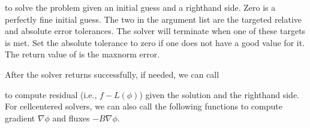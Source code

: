 \documentclass[letterpaper,10pt,english]{sphinxmanual}
\begin{document}
\sphinxAtStartPar
to solve the problem given an initial guess and a right\sphinxhyphen{}hand side.
Zero is a perfectly fine initial guess.  The two  in the argument
list are the targeted relative and absolute error tolerances.
The solver will terminate when one of these targets is met.
Set the absolute tolerance to zero if one
does not have a good value for it.  The return value of 
is the max\sphinxhyphen{}norm error.

\sphinxAtStartPar
After the solver returns successfully, if needed, we can call

\begin{sphinxVerbatim}[commandchars=\\\{\}]
    
                     
                      
\end{sphinxVerbatim}

\sphinxAtStartPar
to compute residual (i.e., \(f - L(\phi)\)) given the solution and
the right\sphinxhyphen{}hand side.  For cell\sphinxhyphen{}centered solvers, we can also call the
following functions to compute gradient \(\nabla \phi\) and fluxes
\(-B \nabla \phi\).

\begin{sphinxVerbatim}[commandchars=\\\{\}]
     
           
\end{sphinxVerbatim}
\end{document}
